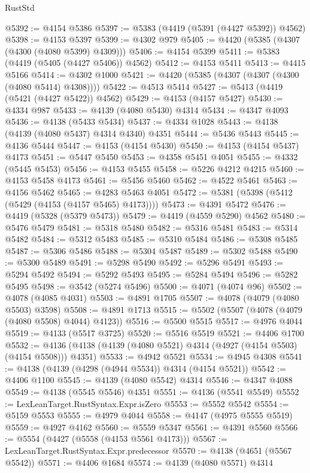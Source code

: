 \begin{lexlean}{RustStd}
\begin{coremodule}
@5392 := @4154 @5386
@5397 := @5383 (@4419 (@5391 (@4427 @5392)) @4562)
@5398 := @4153 @5397
@5399 := @4302 @979
@5405 := @4420 (@5385 (@4307 (@4300 (@4080 @5399) @4309)))
@5406 := @4154 @5399
@5411 := @5383 (@4419 (@5405 (@4427 @5406)) @4562)
@5412 := @4153 @5411
@5413 := @4415 @5166
@5414 := @4302 @1000
@5421 := @4420 (@5385 (@4307 (@4307 (@4300 (@4080 @5414) @4308))))
@5422 := @4513 @5414
@5427 := @5413 (@4419 (@5421 (@4427 @5422)) @4562)
@5429 := @4153 (@4157 @5427)
@5430 := @4334 @987
@5433 := @4139 (@4080 @5430) @4314
@5434 := @4347 @4093
@5436 := @4138 (@5433 @5434)
@5437 := @4334 @1028
@5443 := @4138 (@4139 (@4080 @5437) @4314 @4340) @4351
@5444 := @5436 @5443
@5445 := @4136 @5444
@5447 := @4153 (@4154 @5430)
@5450 := @4153 (@4154 @5437) @4173
@5451 := @5447 @5450
@5453 := @4358 @5451 @4051
@5455 := @4332 (@5445 @5453)
@5456 := @4153 @5455
@5458 := @5226 @4212 @4215
@5460 := @4153 @5458 @4173
@5461 := @5456 @5460
@5462 := @4522 @5461
@5463 := @4156 @5462
@5465 := @4283 @5463 @4051
@5472 := @5381 (@5398 (@5412 (@5429 (@4153 (@4157 @5465) @4173))))
@5473 := @4391 @5472
@5476 := @4419 (@5328 (@5379 @5473))
@5479 := @4419 (@4559 @5290) @4562
@5480 := @5476 @5479
@5481 := @5318 @5480
@5482 := @5316 @5481
@5483 := @5314 @5482
@5484 := @5312 @5483
@5485 := @5310 @5484
@5486 := @5308 @5485
@5487 := @5306 @5486
@5488 := @5304 @5487
@5489 := @5302 @5488
@5490 := @5300 @5489
@5491 := @5298 @5490
@5492 := @5296 @5491
@5493 := @5294 @5492
@5494 := @5292 @5493
@5495 := @5284 @5494
@5496 := @5282 @5495
@5498 := @3542 (@5274 @5496)
@5500 := @4071 (@4074 @96)
@5502 := @4078 (@4085 @4031)
@5503 := @4891 @1705
@5507 := @4078 (@4079 (@4080 @5503) @3598)
@5508 := @4891 @1713
@5515 := @5502 (@5507 (@4078 (@4079 (@4080 @5508) @4044) @4123))
@5516 := @5500 @5515
@5517 := @4976 @4044
@5519 := @4133 (@5517 @3725)
@5520 := @5516 @5519
@5521 := @4406 @1700
@5532 := @4136 (@4138 (@4139 (@4080 @5521) @4314 (@4927 (@4154 @5503) (@4154 @5508))) @4351)
@5533 := @4942 @5521
@5534 := @4945 @4308
@5541 := @4138 (@4139 (@4298 (@4944 @5534)) @4314 (@4154 @5521))
@5542 := @4406 @1100
@5545 := @4139 (@4080 @5542) @4314
@5546 := @4347 @4088
@5549 := @4138 (@5545 @5546) @4351
@5551 := @4136 (@5541 @5549)
@5552 := LexLeanTarget.RustSyntax.Expr.isZero
@5553 := @5552 @5542
@5554 := @5159 @5553
@5555 := @4979 @4044
@5558 := @4147 (@4975 @5555 @5519)
@5559 := @4927 @4162
@5560 := @5559 @5347
@5561 := @4391 @5560
@5566 := @5554 (@4427 (@5558 (@4153 @5561 @4173)))
@5567 := LexLeanTarget.RustSyntax.Expr.predecessor
@5570 := @4138 (@4651 (@5567 @5542))
@5571 := @4406 @1684
@5574 := @4139 (@4080 @5571) @4314

\end{coremodule}
\end{lexlean}
